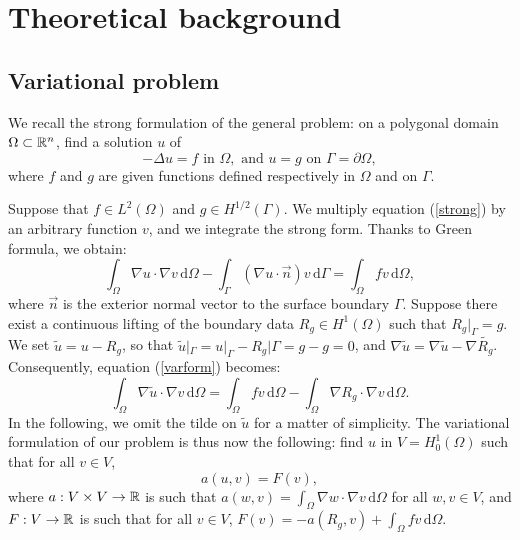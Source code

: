 \newpage
\section{Theoretical background}\label{theory}

\subsection{Variational problem}
We recall the strong formulation of the general problem: on a polygonal domain $\Omega \subset \mathbb{R}^n$, find a solution $u$ of 
\begin{equation}\label{strong}
-\Delta u = f \text{ in } \Omega, \text{ and } u = g \text{ on } \Gamma = \partial \Omega,
\end{equation}
where $f$ and $g$ are given functions defined respectively in $\Omega$ and on $\Gamma$. 

Suppose that $f\in L^2(\Omega)$ and $g\in H^{1/2}(\Gamma)$. We multiply equation (\ref{strong}) by an arbitrary function $v$, and we integrate the strong form. Thanks to Green formula, we obtain:
\begin{equation}\label{varform} \int_\Omega \nabla u\cdot \nabla v \, \mathrm{d}\Omega- \int_\Gamma (\nabla u \cdot \vec{n}) v \, \mathrm{d}\Gamma = \int_\Omega fv \, \mathrm{d}\Omega, 
\end{equation}
where $\vec{n}$ is the exterior normal vector to the surface boundary $\Gamma$. Suppose there exist a continuous lifting of the boundary data $R_g \in H^1(\Omega)$ such that  $R_g|_{\Gamma} = g$. We set $\tilde{u} = u - R_g$, so that $\tilde{u}|_\Gamma = u|_\Gamma - R_g|\Gamma = g-g = 0$, and $\nabla \tilde{u} = \nabla \tilde{u} - \nabla \tilde{R_g}$. Consequently, equation (\ref{varform}) becomes: 
\begin{equation*}
\int_\Omega \nabla \tilde{u}\cdot \nabla v \, \mathrm{d}\Omega = \int_\Omega fv \, \mathrm{d}\Omega -	 \int_\Omega \nabla R_g \cdot \nabla v \, \mathrm{d}\Omega.
\end{equation*}
In the following, we omit the tilde on $\tilde{u}$ for a matter of simplicity. The variational formulation of our problem is thus now the following: find $u$ in $V=H^1_0(\Omega)$ such that for all $v\in V$, 
\begin{equation}\label{weak}
a(u,v) = F(v),
\end{equation}
where $a : V \times V \rightarrow \mathbb{R}$ is such that $a(w,v) = \int_\Omega \nabla w\cdot \nabla v \, \mathrm{d}\Omega$ for all $w,v\in V$, and $F:V\rightarrow\mathbb{R}$ is such that for all $v\in V$, $F(v) = -a(R_g, v) + \int_\Omega fv \, \mathrm{d}\Omega$.

